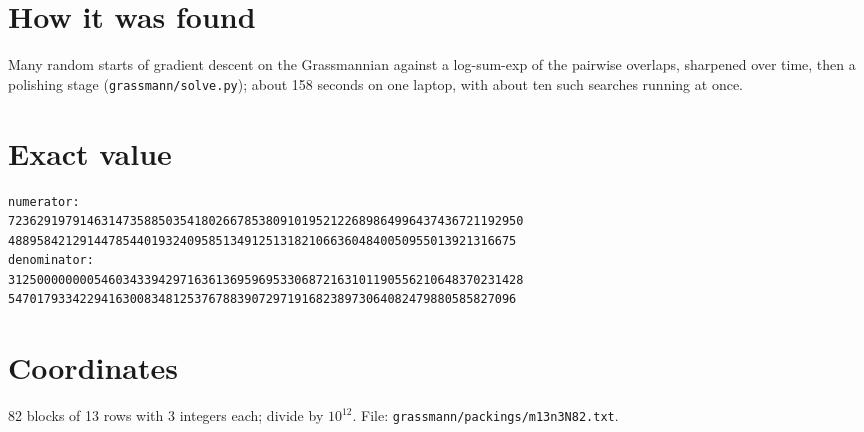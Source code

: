 \documentclass[11pt,a4paper]{article}
\begin{document}
\section{How it was found}
Many random starts of gradient descent on the Grassmannian against a log-sum-exp of the pairwise overlaps, sharpened over time, then a polishing stage (\texttt{grassmann/solve.py}); about 158 seconds on one laptop, with about ten such searches running at once.


\appendix
\section{Exact value}
{\small
\begin{verbatim}
numerator:
723629197914631473588503541802667853809101952122689864996437436721192950
48895842129144785440193240958513491251318210663604840050955013921316675
denominator:
312500000000546034339429716361369596953306872163101190556210648370231428
54701793342294163008348125376788390729719168238973064082479880585827096
\end{verbatim}}

\section{Coordinates}
82 blocks of 13 rows with 3 integers each; divide by $10^{12}$. File: \texttt{grassmann/packings/m13n3N82.txt}.
{\tiny
\begin{multicols}{3}
\end{multicols}}
\end{document}
